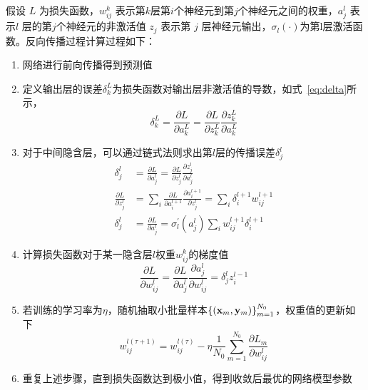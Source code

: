 假设 $L$ 为损失函数，$w_{ij}^k$ 表示第$k$层第$i$个神经元到第$j$个神经元之间的权重，$a_j^l$ 表示$l$ 层的第$j$个神经元的非激活值
$z_j$ 表示第 $j$ 层神经元输出，$\sigma_l(\cdot)$为第l层激活函数。反向传播过程计算过程如下：
\begin{enumerate}[label=(\alph*)]
  \item 网络进行前向传播得到预测值
  \item 定义输出层的误差$\delta_k^L$为损失函数对输出层非激活值的导数，如式~\ref{eq:delta}所示，
  \begin{equation}
    \delta_k^L = \frac{\partial L}{\partial a_k^L} = \frac{\partial L}{\partial z_k^L} \frac{\partial z_k^L}{\partial a_k^L}
    \label{eq:delta}
  \end{equation}
  \item 对于中间隐含层，可以通过链式法则求出第$l$层的传播误差$\delta_j^l$
  \begin{equation}
    \begin{aligned}
    \delta_j^l & = \frac{\partial L}{\partial a_j^l} = \frac{\partial L}{\partial z_j^l} \frac{\partial z_j^l}{\partial a_j^l} \\
    \frac{{\partial L}}{{\partial z_j^l}} & = \sum\limits_i^{} {\frac{{\partial L}}{{\partial a_i^{l + 1}}}} \frac{{\partial a_i^{l + 1}}}{{\partial z_j^l}} = \sum\limits_i^{} {\delta _i^{l + 1}} w_{ij}^{l + 1} \\
    \delta_j^l & = \frac{{\partial L}}{{\partial a_j^l}} = \sigma _l^\prime \left( {a_j^l} \right)\sum\limits_i^{} {w_{ij}^{l + 1}} \delta _i^{l + 1}
    \end{aligned}
    \label{eq:delta_l}
  \end{equation}
  \item 计算损失函数对于某一隐含层$l$权重$w_{ij}^k$的梯度值
  \begin{equation}
    \frac{{\partial L}}{{\partial w_{ij}^l}} = \frac{{\partial L}}{{\partial a_j^l}}\frac{{\partial a_j^l}}{{\partial w_{ij}^l}} = \delta_j^l z_i^{l - 1}
    \label{eq:delta_w}
  \end{equation}
  \item 若训练的学习率为$\eta$，随机抽取小批量样本$\left\{ {\left( {{{\bf{x}}_m},{{\bf{y}}_m}} \right)} \right\}_{m = 1}^{{N_0}}$，权重值的更新如下
  \begin{equation}
    w_{ij}^{l(\tau  + 1)} = w_{ij}^{l(\tau )} - \eta \frac{1}{{{N_0}}}\sum\limits_{m = 1}^{{N_0}} {\frac{{\partial {L_m}}}{{\partial w_{ij}^l}}}
    \label{eq:update}
  \end{equation}
  \item 重复上述步骤，直到损失函数达到极小值，得到收敛后最优的网络模型参数
\end{enumerate}

